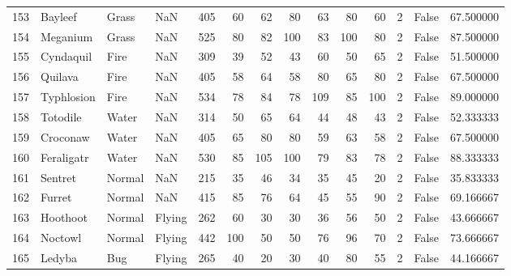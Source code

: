\begin{tabular}{rlllrrrrrrrrlr}
 153 &                    Bayleef &     Grass &       NaN &    405 &   60 &      62 &       80 &       63 &       80 &     60 &           2 &      False &   67.500000 \\
 154 &                   Meganium &     Grass &       NaN &    525 &   80 &      82 &      100 &       83 &      100 &     80 &           2 &      False &   87.500000 \\
 155 &                  Cyndaquil &      Fire &       NaN &    309 &   39 &      52 &       43 &       60 &       50 &     65 &           2 &      False &   51.500000 \\
 156 &                    Quilava &      Fire &       NaN &    405 &   58 &      64 &       58 &       80 &       65 &     80 &           2 &      False &   67.500000 \\
 157 &                 Typhlosion &      Fire &       NaN &    534 &   78 &      84 &       78 &      109 &       85 &    100 &           2 &      False &   89.000000 \\
 158 &                   Totodile &     Water &       NaN &    314 &   50 &      65 &       64 &       44 &       48 &     43 &           2 &      False &   52.333333 \\
 159 &                   Croconaw &     Water &       NaN &    405 &   65 &      80 &       80 &       59 &       63 &     58 &           2 &      False &   67.500000 \\
 160 &                 Feraligatr &     Water &       NaN &    530 &   85 &     105 &      100 &       79 &       83 &     78 &           2 &      False &   88.333333 \\
 161 &                    Sentret &    Normal &       NaN &    215 &   35 &      46 &       34 &       35 &       45 &     20 &           2 &      False &   35.833333 \\
 162 &                     Furret &    Normal &       NaN &    415 &   85 &      76 &       64 &       45 &       55 &     90 &           2 &      False &   69.166667 \\
 163 &                   Hoothoot &    Normal &    Flying &    262 &   60 &      30 &       30 &       36 &       56 &     50 &           2 &      False &   43.666667 \\
 164 &                    Noctowl &    Normal &    Flying &    442 &  100 &      50 &       50 &       76 &       96 &     70 &           2 &      False &   73.666667 \\
 165 &                     Ledyba &       Bug &    Flying &    265 &   40 &      20 &       30 &       40 &       80 &     55 &           2 &      False &   44.166667 \\

\end{tabular}
